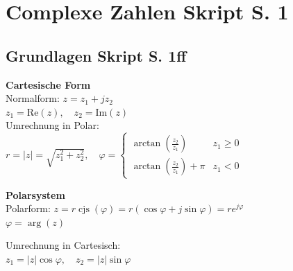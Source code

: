 \newcommand{\titleinfo}{Complexe Zahlen, Fourierreihen - Formelsammlung}
\newcommand{\authorinfo}{F. Braun, L. Schmid, U. Giger, R. Koller, E. Ammann, S.
Arnold, C.Gwerder, S.K\"orner, L.Leuenberger}
\newcommand{\versioninfo}{$Revision: 878 $ - powered by \LaTeX}


\newcommand{\verweis}[2]{\small{(siehe auch \ref{#1}, #2 (S. \pageref{#1}))}}

\newcommand{\skriptsection}[2]{\section{#1 {\tiny Skript S. #2}}}
\newcommand{\skriptsubsection}[2]{\subsection{#1 {\tiny Skript S. #2}}}
\newcommand{\skriptsubsubsection}[2]{\subsubsection{#1 {\tiny Skript S. #2}}}

\DeclareMathOperator{\cjs}{cjs}
\DeclareMathOperator{\Ln}{Ln}



\setlength{\parindent}{0pt}

\skriptsection{Complexe Zahlen}{1}
\skriptsubsection{Grundlagen}{1ff}
\begin{minipage}[t]{9.4cm}
	\textbf{Cartesische Form}\\
	Normalform: $z = z_1 +j z_2$\\
	$z_1 = \text{Re}(z), \quad z_2 = \text{Im}(z)$\\
	Umrechnung in Polar:\\
	$r = |z| = \sqrt{z_1^2 + z_2^2}, \quad 
	\varphi = 	\begin{cases} 
                	\arctan(\frac{z_2}{z_1}) &z_1 \geq 0\\
                	\arctan(\frac{z_2}{z_1}) + \pi &z_1 < 0
    			\end{cases}$
\end{minipage}
\begin{minipage}[t]{9.4cm}
	\textbf{Polarsystem}\\
	Polarform: 
	$z = r \cjs(\varphi) = r(\cos{\varphi} + j\sin{\varphi}) = r e^{j \varphi}$\\
	$\varphi = \arg(z)$

	Umrechnung in Cartesisch:\\
	$z_1 = |z| \cos{\varphi}, \quad z_2 = |z| \sin{\varphi}$
\end{minipage}

